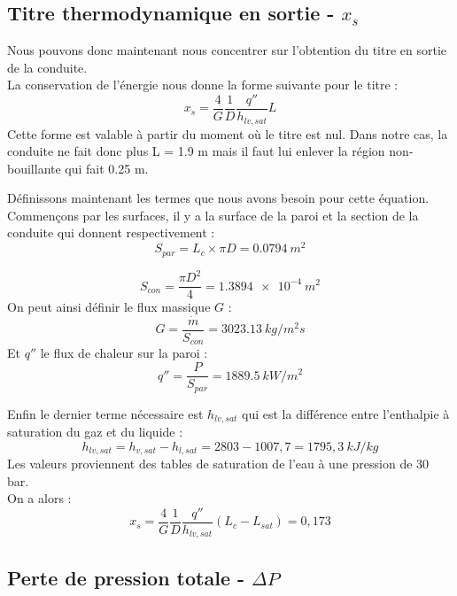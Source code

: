\subsection{Titre thermodynamique en sortie - $x_s$}
Nous pouvons donc maintenant nous concentrer sur l'obtention du titre en sortie de la conduite.\\
La conservation de l'énergie nous donne la forme suivante pour le titre :
\begin{equation}
    x_s = \frac{4}{G}\frac{1}{D}\frac{q''}{h_{lv,sat}}L
\end{equation}
Cette forme est valable à partir du moment où le titre est nul. Dans notre cas, la conduite ne fait donc plus L = 1.9 \si{m} mais il faut lui enlever la région non-bouillante qui fait 0.25 \si{m}.\\ \par
Définissons maintenant les termes que nous avons besoin pour cette équation. Commençons par les surfaces, il y a la surface de la paroi et la section de la conduite qui donnent respectivement :
\begin{equation}
    S_{par} = L_c \times \pi D = \num{0.0794}~\si{m^2}
\end{equation}

\begin{equation}
    S_{con} = \frac{\pi D^2}{4} = \num{1.3894e-4}~\si{m^2}
\end{equation}
On peut ainsi définir le flux massique $G$ :
\begin{equation}
    G = \frac{\dot{m}}{S_{con}} = \num{3023.13} ~\si{kg/m^2s}
\end{equation}
Et $q''$ le flux de chaleur sur la paroi :
\begin{equation}
    q'' = \frac{P}{S_{par}} = \num{1889,5} ~\si{kW/m^2}
\end{equation}

Enfin le dernier terme nécessaire est $h_{lv,sat}$ qui est la différence entre l'enthalpie à saturation du gaz et du liquide :
\begin{equation}
    h_{lv,sat} = h_{v,sat} - h_{l,sat} = 2803 -1007,7 = 1795,3 ~\si{kJ/kg}
\end{equation}
Les valeurs proviennent des tables de saturation de l'eau à une pression de 30 \si{bar}.\\
On a alors : 
\begin{equation}\boxed{
    x_s = \frac{4}{G}\frac{1}{D}\frac{q''}{h_{lv,sat}} \left(L_c - L_{sat}\right) = 0,173
    }
\end{equation}
\subsection{Perte de pression totale - $\Delta P$}


